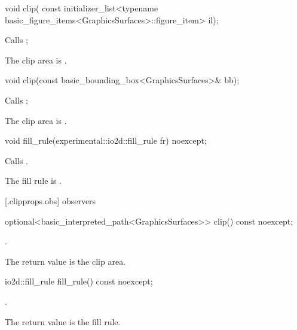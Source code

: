 %
\begin{itemdecl}
void clip(
  const initializer_list<typename 
  basic_figure_items<GraphicsSurfaces>::figure_item> il);
\end{itemdecl}
\begin{itemdescr}
\pnum
\effects
Calls ;

\pnum
\remarks
The clip area is .
\end{itemdescr}

%
\begin{itemdecl}
void clip(const basic_bounding_box<GraphicsSurfaces>& bb);
\end{itemdecl}
\begin{itemdescr}
\pnum
\effects
Calls ;

\pnum
\remarks
The clip area is .
\end{itemdescr}

%
\begin{itemdecl}
void fill_rule(experimental::io2d::fill_rule fr) noexcept;
\end{itemdecl}
\begin{itemdescr}
\pnum
\effects
Calls .

\pnum
\remarks
The fill rule is .
\end{itemdescr}

 [\iotwod.clipprops.obs] { observers}

%
\begin{itemdecl}
optional<basic_interpreted_path<GraphicsSurfaces>> clip() const noexcept;
\end{itemdecl}
\begin{itemdescr}
\pnum
\returns
{}.

\pnum
\remarks
The return value is the clip area.
\end{itemdescr}

%
\begin{itemdecl}
io2d::fill_rule fill_rule() const noexcept;
\end{itemdecl}
\begin{itemdescr}
\pnum
\returns
{}.

\pnum
\remarks
The return value is the fill rule.
\end{itemdescr}
